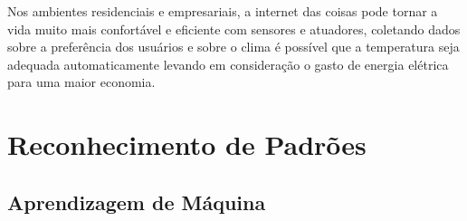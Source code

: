 Nos ambientes residenciais e empresariais, a internet das coisas pode tornar a vida muito mais confortável e eficiente com sensores e atuadores, coletando dados sobre a preferência dos usuários e sobre o clima é possível que a temperatura seja adequada automaticamente levando em consideração o gasto de energia elétrica para uma maior economia.

\section{Reconhecimento de Padrões}


\subsection{Aprendizagem de Máquina}
